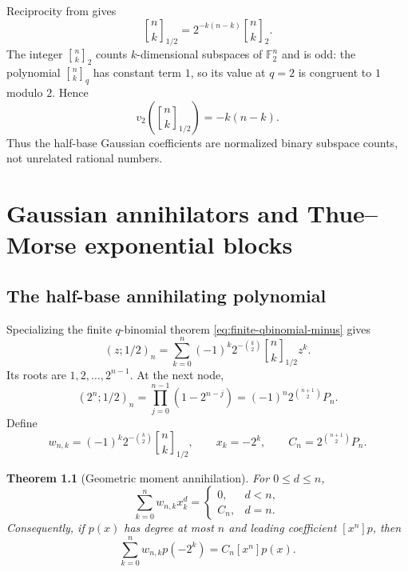 \documentclass[11pt,oneside,openany]{book}
\newtheorem{theorem}{Theorem}[chapter]
\theoremstyle{definition}
\theoremstyle{remark}
\newcommand{\qbinom}[2]{\genfrac{[}{]}{0pt}{}{#1}{#2}_{q}}
\newcommand{\Qbinom}[3]{\genfrac{[}{]}{0pt}{}{#1}{#2}_{#3}}
\newcommand{\F}{\mathbb F}
\begin{document}
Reciprocity from  gives
\begin{equation}
 \Qbinom nk{1/2}=2^{-k(n-k)}\Qbinom nk2.
 \label{eq:fab-half-vs-two}
\end{equation}
The integer $\Qbinom nk2$ counts $k$-dimensional subspaces of $\F_2^n$ and is odd: the polynomial $\qbinom nk$ has constant term $1$, so its value at $q=2$ is congruent to $1$ modulo $2$.  Hence
\begin{equation}
 v_2\!\left(\Qbinom nk{1/2}\right)=-k(n-k).
 \label{eq:fab-half-valuation}
\end{equation}
Thus the half-base Gaussian coefficients are normalized binary subspace counts, not unrelated rational numbers.

\chapter{Gaussian annihilators and Thue--Morse exponential blocks}\label{chap:fabius-annihilator}

\section{The half-base annihilating polynomial}

Specializing the finite $q$-binomial theorem \eqref{eq:finite-qbinomial-minus} gives
\begin{equation}
 (z;1/2)_n
 =\sum_{k=0}^n(-1)^k2^{-\binom k2}
   \Qbinom nk{1/2}z^k.
 \label{eq:fab-finite-half-qbinomial}
\end{equation}
Its roots are $1,2,\ldots,2^{n-1}$.  At the next node,
\begin{equation}
 (2^n;1/2)_n
 =\prod_{j=0}^{n-1}(1-2^{n-j})
 =(-1)^n2^{\binom{n+1}{2}}P_n.
 \label{eq:fab-endpoint-product}
\end{equation}
Define
\begin{equation}
 w_{n,k}=(-1)^k2^{-\binom k2}\Qbinom nk{1/2},
 \qquad x_k=-2^k,
 \qquad C_n=2^{\binom{n+1}{2}}P_n.
 \label{eq:fab-weights}
\end{equation}

\begin{theorem}[Geometric moment annihilation]\label{thm:fab-annihilation}
For $0\le d\le n$,
\begin{equation}
 \sum_{k=0}^nw_{n,k}x_k^d
 =\begin{cases}
 0,&d<n,\\
 C_n,&d=n.
 \end{cases}
 \label{eq:fab-weight-moments}
\end{equation}
Consequently, if $p(x)$ has degree at most $n$ and leading coefficient $[x^n]p$, then
\begin{equation}
 \sum_{k=0}^nw_{n,k}p(-2^k)=C_n[x^n]p(x).
 \label{eq:fab-leading-extractor}
\end{equation}
\end{theorem}
\end{document}
